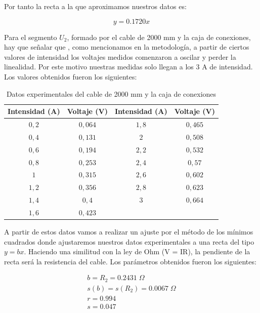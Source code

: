 \documentclass[a4paper,12pt,titlepage]{report}
\begin{document}
Por tanto la recta a la que aproximamos nuestros datos es:

\begin{equation}
    y = 0.1720x
\end{equation}

Para el segmento $U_{2}$, formado por el cable de 2000 mm y la caja de conexiones, hay que señalar que , como mencionamos en la metodología, a partir de ciertos valores de intensidad los voltajes medidos comenzaron a oscilar y perder la linealidad. Por este motivo nuestras medidas solo llegan a los $3$ A de intensidad. Los valores obtenidos fueron los siguientes:

\begin{table}[h!]
    \centering
    \begin{tabular}{|c|c|c|c|}
        \hline
        Intensidad (A) & Voltaje (V) & Intensidad (A) & Voltaje (V) \\ \hline
        $0,2$ & $0,064$ & $1,8$ & $0,465$ \\ \hline
        $0,4$ & $0,131$ & $2$ & $0,508$ \\\hline
        $0,6$ & $0,194$ & $2,2$ & $0,532$ \\\hline
        $0,8$ & $0,253$ & $2,4$ & $0,57$ \\\hline
        $1$ & $0,315$ & $2,6$ & $0,602$ \\\hline
        $1,2$ & $0,356$ & $2,8$ & $0,623$ \\\hline
        $1,4$ & $0,4$ & $3$ & $0,664$ \\\hline
        $1,6$ & $0,423$ & & \\
    \hline
    \end{tabular}
    \caption{Datos experimentales del cable de 2000 mm y la caja de conexiones}
\end{table}

\newpage

A partir de estos datos vamos a realizar un ajuste por el método de los mínimos cuadrados donde ajustaremos nuestros datos experimentales a una recta del tipo $y = bx$. Haciendo una similitud con la ley de Ohm (V = IR), la pendiente de la recta será la resistencia del cable. Los parámetros obtenidos fueron los siguientes:

\begin{equation}
    \begin{gathered}
        b = R_{2} = 0.2431 \; \Omega \\
        s(b) = s(R_{2}) = 0.0067\; \Omega \\
        r =    0.994 \\
        s =  0.047
    \end{gathered}
\end{equation}
\end{document}
